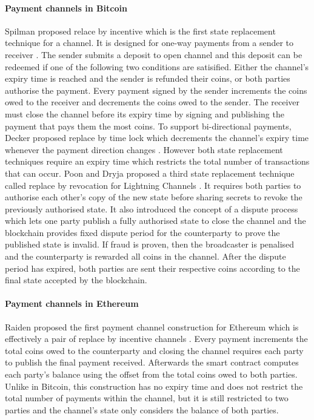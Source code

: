 \documentclass{llncs}
\begin{document}
\paragraph{Payment channels in Bitcoin} 
Spilman proposed relace by incentive which is the first state replacement technique for a channel.
It is designed for one-way payments from a sender to receiver \cite{spilman2013}.
The sender submits a deposit to open  channel and this deposit can be redeemed if one of the following two conditions are satisified. 
Either the channel's expiry time is reached and the sender is refunded their coins, or both parties authorise the payment. 
Every payment signed by the sender increments the coins owed to the receiver and decrements the coins owed to the sender.  
The receiver must close the channel before its expiry time by signing and publishing the payment that pays them the most coins. 
To support bi-directional payments, Decker proposed replace by time lock which decrements the channel's expiry time whenever the payment direction changes \cite{decker2015fast}.
However both state replacement techniques require an expiry time which restricts the total number of transactions that can occur. 
Poon and Dryja proposed a third state replacement technique called replace by revocation for Lightning Channels \cite{poon2016bitcoin}.  
It requires both parties to authorise each other's copy of the new state before sharing secrets to revoke the previously authorised state. 
It also introduced the concept of a dispute process which lets one party publish a fully authorised state to close the channel and the blockchain provides fixed dispute period for the counterparty to prove the published state is invalid.
If fraud is proven, then the broadcaster is penalised and the counterparty is rewarded all coins in the channel.
After the dispute period has expired, both parties are sent their respective coins according to the final state accepted by the blockchain. 


\paragraph{Payment channels in Ethereum}
Raiden proposed the first payment channel construction for Ethereum which is effectively a pair of replace by incentive channels \cite{raidenCode}. 
Every payment increments the total coins owed to the counterparty and closing the channel requires each party to publish the final payment received. 
Afterwards the smart contract computes each party's balance using the offset from the total coins owed to both parties. 
Unlike in Bitcoin, this construction has no expiry time and does not restrict the total number of payments within the channel, but it is still restricted to two parties and the channel's state only considers the balance of both parties. 
\end{document}
